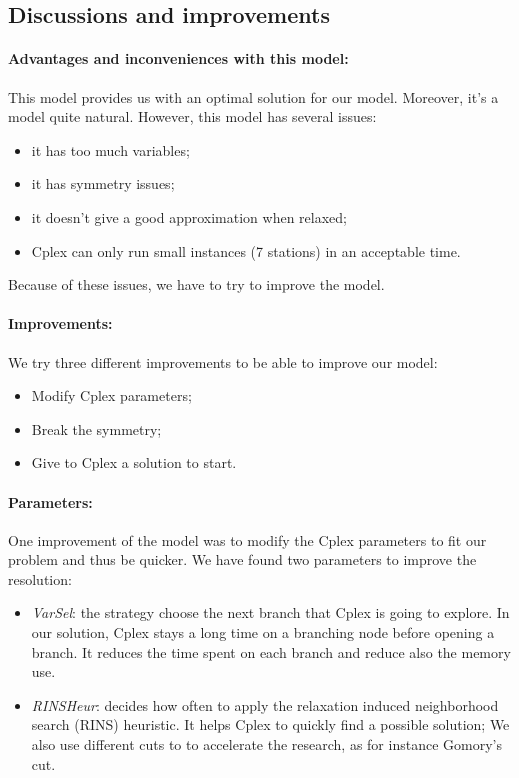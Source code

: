 \begin{bibunit}[ieeetr]
\section{Discussions and improvements}

\paragraph{Advantages and inconveniences with this model:}
This model provides us with an optimal solution for our model.
Moreover, it's a model quite natural.
However, this model has several issues:
\begin{itemize}
\item it has too much variables;
\item it has symmetry issues;
\item it doesn't give a good approximation when relaxed;
\item Cplex can only run small instances (7 stations) in an acceptable time.
\end{itemize}
Because of these issues, we have to try to improve the model.

\paragraph{Improvements:}
We try three different improvements to be able to improve our model:
\begin{itemize}
\item Modify Cplex parameters;
\item Break the symmetry;
\item Give to Cplex a solution to start.
\end{itemize}

\paragraph{Parameters:}
One improvement of the model was to modify the Cplex parameters to fit our problem and thus be quicker.
We have found two parameters to improve the resolution:
\begin{itemize}
\item \emph{VarSel}:
the strategy choose the next branch that Cplex is going to explore.
In our solution, Cplex stays a long time on a branching node before opening a branch.
It reduces the time spent on each branch and reduce also the memory use.
\item \emph{RINSHeur}:
decides how often to apply the relaxation induced neighborhood search (RINS) heuristic.
It helps Cplex to quickly find a possible solution;
We also use different cuts to to accelerate the research, as for instance Gomory's cut.
\end{itemize}


\end{bibunit}
